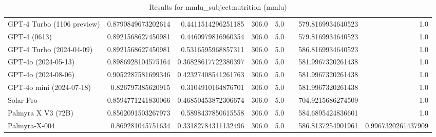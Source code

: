 \begin{table}[htp]
{\begin{tabular}{lrrrrrrr}
GPT-4 Turbo (1106 preview) & 0.8790849673202614 & 0.4411514296251185 & 306.0 & 5.0 &  & 579.8169934640523 & 1.0 \\
GPT-4 (0613) & 0.8921568627450981 & 0.4460979816960354 & 306.0 & 5.0 &  & 579.8169934640523 & 1.0 \\
GPT-4 Turbo (2024-04-09) & 0.8921568627450981 & 0.5316595968857311 & 306.0 & 5.0 &  & 586.8169934640523 & 1.0 \\
GPT-4o (2024-05-13) & 0.8986928104575164 & 0.36828617722380397 & 306.0 & 5.0 &  & 581.9967320261438 & 1.0 \\
GPT-4o (2024-08-06) & 0.9052287581699346 & 0.42327408541261763 & 306.0 & 5.0 &  & 581.9967320261438 & 1.0 \\
GPT-4o mini (2024-07-18) & 0.826797385620915 & 0.3104910164876701 & 306.0 & 5.0 &  & 581.9967320261438 & 1.0 \\
Solar Pro & 0.8594771241830066 & 0.46850453872306674 & 306.0 & 5.0 &  & 704.9215686274509 & 1.0 \\
Palmyra X V3 (72B) & 0.8562091503267973 & 0.5898437850615558 & 306.0 & 5.0 &  & 584.6895424836601 & 1.0 \\
Palmyra-X-004 & 0.869281045751634 & 0.33182784311132496 & 306.0 & 5.0 &  & 586.8137254901961 & 0.9967320261437909 \\
\bottomrule
\end{tabular}}
\caption{Results for mmlu_subject:nutrition (mmlu)}
\label{fig:mmlu_subject:nutrition (mmlu)}
\end{table}